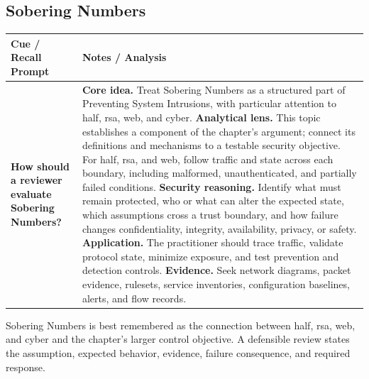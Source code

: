 \documentclass[11pt]{article}
\newcommand{\CornellHeader}{%
\rowcolor{Navy}\color{white}\bfseries Cue / Recall Prompt & \color{white}\bfseries Notes / Analysis\\\hline}
\newcommand{\CornellRow}[2]{%
\cellcolor{CueGray}\RaggedRight\textbf{#1} & \RaggedRight #2\\\hline}
\begin{document}
\subsection*{Sobering Numbers}
\begin{longtable}{>{\RaggedRight\arraybackslash}p{}|>{\RaggedRight\arraybackslash}p{}}
\CornellHeader
\CornellRow{How should a reviewer evaluate Sobering Numbers?}{\textbf{Core idea.} Treat Sobering Numbers as a structured part of Preventing System Intrusions, with particular attention to half, rsa, web, and cyber. \textbf{Analytical lens.} This topic establishes a component of the chapter's argument; connect its definitions and mechanisms to a testable security objective. For half, rsa, and web, follow traffic and state across each boundary, including malformed, unauthenticated, and partially failed conditions. \textbf{Security reasoning.} Identify what must remain protected, who or what can alter the expected state, which assumptions cross a trust boundary, and how failure changes confidentiality, integrity, availability, privacy, or safety. \textbf{Application.} The practitioner should trace traffic, validate protocol state, minimize exposure, and test prevention and detection controls. \textbf{Evidence.} Seek network diagrams, packet evidence, rulesets, service inventories, configuration baselines, alerts, and flow records.}
\end{longtable}
\begin{topicsummary}
Sobering Numbers is best remembered as the connection between half, rsa, web, and cyber and the chapter's larger control objective. A defensible review states the assumption, expected behavior, evidence, failure consequence, and required response.
\end{topicsummary}
\end{document}

